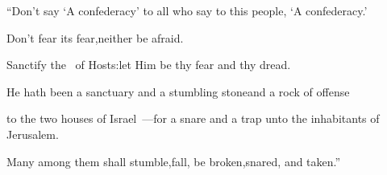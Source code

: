 \begin{inparaenum}
  \pb{} ``Don't say `A confederacy'%
  \pa{}to all who say to this people, `A confederacy.'%

  \pb{}Don't fear its fear,\pa{}neither be afraid.%

  \pb{} Sanctify the \lord\ of Hosts:\pa{}let Him be thy fear and thy dread.%

  \pb{} He hath been a sanctuary and a stumbling stone\pa{}and a rock of offense%

  \pb{}to the two houses of Israel~---\pa{}for a snare and a trap unto the inhabitants of Jerusalem.%

  \pb{} Many among them shall stumble,\pa{}fall, be broken,\pa{}snared, and taken.''%


\end{inparaenum}
